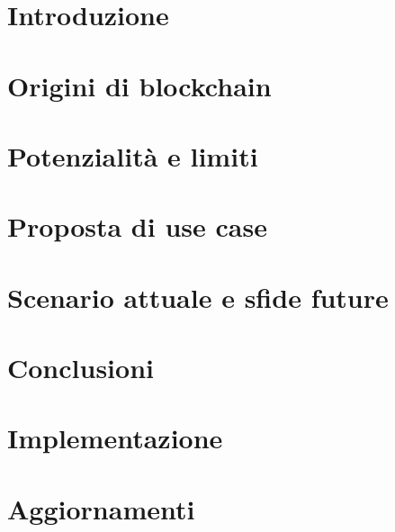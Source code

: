 \documentclass[12pt,twoside,openright]{report}
\begin{document}
\tableofcontents
\listoffigures

\chapter{Introduzione}


\chapter{Origini di blockchain}\label{cap:origini}


\chapter{Potenzialità e limiti}\label{cap:analisiTecnologia}


\chapter{Proposta di use case}\label{cap:proposta}


\chapter{Scenario attuale e sfide future}\label{cap:scenario}


\chapter{Conclusioni}\label{cap:conclusioni}


\appendix

\chapter{Implementazione}


\chapter{Aggiornamenti}


{}

\end{document}

